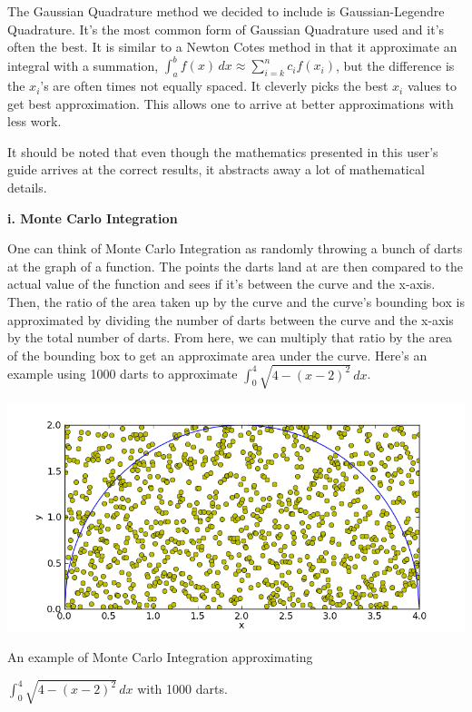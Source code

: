 \documentclass[12pt]{article}
\newcommand{\newLine}{\vspace{5mm}}
\newcommand{\nextsubsection}[1]{\newLine \noindent \large \textbf{#1} \normalsize}
\newcommand{\integral}[3]{\text{$\int^{#2}_{#1} #3\,dx$}}
\newcommand{\summation}[3]{\text{$\sum^{#2}_{#1} #3$}}
\begin{document}
The Gaussian Quadrature method we decided to include is Gaussian-Legendre Quadrature. It's the most common form of Gaussian Quadrature used and it's often the best. It is similar to a Newton Cotes method in that it approximate an integral with a summation, $\integral{a}{b}{f(x)} \approx \summation{i=k}{n}{c_if(x_i)}$, but the difference is the $x_i$'s are often times not equally spaced. It cleverly picks the best $x_i$ values to get best approximation. This allows one to arrive at better approximations with less work.

It should be noted that even though the mathematics presented in this user's guide arrives at the correct results, it abstracts away a lot of mathematical details.

\nextsubsection{i. Monte Carlo Integration}

\newLine One can think of Monte Carlo Integration as randomly throwing a bunch of darts at the graph of a function. The points the darts land at are then compared to the actual value of the function and sees if it's between the curve and the x-axis. Then, the ratio of the area taken up by the curve and the curve's bounding box is approximated by dividing the number of darts between the curve and the x-axis by the total number of darts. From here, we can multiply that ratio by the area of the bounding box to get an approximate area under the curve. Here's an example using 1000 darts to approximate $\integral{0}{4}{\sqrt{4 - (x - 2)^2}}$.


\begin{center}
\includegraphics[scale=0.5]{semiCircleMonteCarlo.png}

\small An example of Monte Carlo Integration approximating 

$\integral{0}{4}{\sqrt{4 - (x - 2)^2}}$ with 1000 darts. \normalsize
\end{center}
\end{document}
